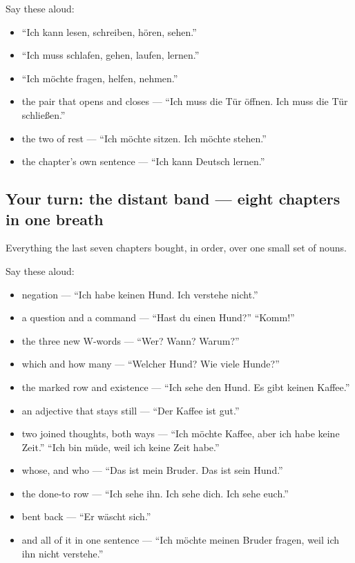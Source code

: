 Say these aloud:

\begin{itemize}
\raggedright
  \item \textquotedblleft{}Ich kann lesen, schreiben, hören, sehen.\textquotedblright{}
  \item \textquotedblleft{}Ich muss schlafen, gehen, laufen, lernen.\textquotedblright{}
  \item \textquotedblleft{}Ich möchte fragen, helfen, nehmen.\textquotedblright{}
  \item the pair that opens and closes — \textquotedblleft{}Ich muss die Tür öffnen. Ich muss die Tür schließen.\textquotedblright{}
  \item the two of rest — \textquotedblleft{}Ich möchte sitzen. Ich möchte stehen.\textquotedblright{}
  \item the chapter's own sentence — \textquotedblleft{}Ich kann Deutsch lernen.\textquotedblright{}
\end{itemize}

\subsection*{Your turn: the distant band — eight chapters in one breath}
Everything the last seven chapters bought, in order, over one small set of nouns.

Say these aloud:

\begin{itemize}
\raggedright
  \item negation — \textquotedblleft{}Ich habe keinen Hund. Ich verstehe nicht.\textquotedblright{}
  \item a question and a command — \textquotedblleft{}Hast du einen Hund?\textquotedblright{} \textquotedblleft{}Komm!\textquotedblright{}
  \item the three new W-words — \textquotedblleft{}Wer? Wann? Warum?\textquotedblright{}
  \item which and how many — \textquotedblleft{}Welcher Hund? Wie viele Hunde?\textquotedblright{}
  \item the marked row and existence — \textquotedblleft{}Ich sehe den Hund. Es gibt keinen Kaffee.\textquotedblright{}
  \item an adjective that stays still — \textquotedblleft{}Der Kaffee ist gut.\textquotedblright{}
  \item two joined thoughts, both ways — \textquotedblleft{}Ich möchte Kaffee, aber ich habe keine Zeit.\textquotedblright{} \textquotedblleft{}Ich bin müde, weil ich keine Zeit habe.\textquotedblright{}
  \item whose, and who — \textquotedblleft{}Das ist mein Bruder. Das ist sein Hund.\textquotedblright{}
  \item the done-to row — \textquotedblleft{}Ich sehe ihn. Ich sehe dich. Ich sehe euch.\textquotedblright{}
  \item bent back — \textquotedblleft{}Er wäscht sich.\textquotedblright{}
  \item and all of it in one sentence — \textquotedblleft{}Ich möchte meinen Bruder fragen, weil ich ihn nicht verstehe.\textquotedblright{}
\end{itemize}

